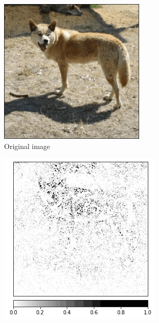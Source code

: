 \begin{figure}[h]
  \centering
 \begin{subfigure}{.19\textwidth}
    \centering
    \includegraphics[width=\textwidth]{methods/images/dingo.png}
    \caption{Original image}\label{fig:noisetunnel-dingo}
\end{subfigure}
 \begin{subfigure}{.19\textwidth}
    \centering
    \includegraphics[width=\textwidth]{methods/images/ig-dingo.png}

\end{subfigure}
\end{figure}
